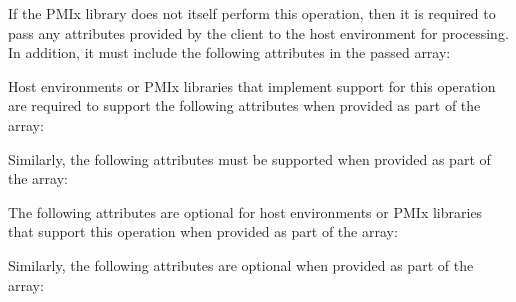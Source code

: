 \format


\begin{arglist}
\end{arglist}

\returnsimple

\reqattrstart
If the \ac{PMIx} library does not itself perform this operation, then it is required to pass any attributes provided by the client to the host environment for processing. In addition, it must include the following attributes in the passed  array:


Host environments or \ac{PMIx} libraries that implement support for this operation are required to support the following attributes when provided as part of the  array:


Similarly, the following attributes must be supported when provided as part of the  array:


\reqattrend

\optattrstart
The following attributes are optional for host environments or \ac{PMIx} libraries that support this operation when provided as part of the  array:


Similarly, the following attributes are optional when provided as part of the  array:

